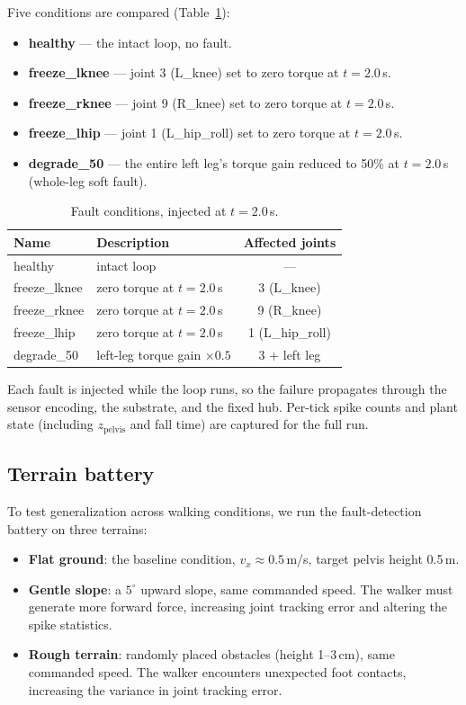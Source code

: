 Five conditions are compared (Table~\ref{tab:faults}):
\begin{itemize}
\item \textbf{healthy} --- the intact loop, no fault.
\item \textbf{freeze\_lknee} --- joint 3 (L\_knee) set to zero torque at
      $t = 2.0$\,s.
\item \textbf{freeze\_rknee} --- joint 9 (R\_knee) set to zero torque at
      $t = 2.0$\,s.
\item \textbf{freeze\_lhip} --- joint 1 (L\_hip\_roll) set to zero torque at
      $t = 2.0$\,s.
\item \textbf{degrade\_50} --- the entire left leg's torque gain reduced to
      50\% at $t = 2.0$\,s (whole-leg soft fault).
\end{itemize}

\begin{table}[t]
\caption{Fault conditions, injected at $t = 2.0$\,s.}
\label{tab:faults}
\centering
\begin{tabular}{@{}llc@{}}
\toprule
Name & Description & Affected joints \\
\midrule
healthy & intact loop & --- \\
freeze\_lknee & zero torque at $t=2.0$\,s & 3 (L\_knee) \\
freeze\_rknee & zero torque at $t=2.0$\,s & 9 (R\_knee) \\
freeze\_lhip & zero torque at $t=2.0$\,s & 1 (L\_hip\_roll) \\
degrade\_50 & left-leg torque gain $\times 0.5$ & 3 + left leg \\
\bottomrule
\end{tabular}
\end{table}

Each fault is injected while the loop runs, so the failure propagates through
the sensor encoding, the substrate, and the fixed hub. Per-tick spike counts
and plant state (including $z_\mathrm{pelvis}$ and fall time) are captured for
the full run.

\subsection{Terrain battery}

To test generalization across walking conditions, we run the fault-detection
battery on three terrains:
\begin{itemize}
\item \textbf{Flat ground}: the baseline condition, $v_x \approx 0.5$\,m/s,
      target pelvis height 0.5\,m.
\item \textbf{Gentle slope}: a $5^\circ$ upward slope, same commanded speed.
      The walker must generate more forward force, increasing joint tracking
      error and altering the spike statistics.
\item \textbf{Rough terrain}: randomly placed obstacles (height 1--3\,cm),
      same commanded speed. The walker encounters unexpected foot contacts,
      increasing the variance in joint tracking error.
\end{itemize}

